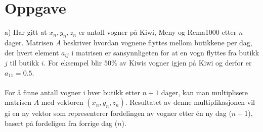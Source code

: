 

\usepackage{graphicx}
\graphicspath{ {./fig/} }


\newcommand{\tuple}[1]{\ensuremath{\langle #1\rangle}}
\newcommand{\set}[1]{\ensuremath{\{#1\}}}
\newcommand{\imp}{\ensuremath{\rightarrow}}
\newcommand{\M}{\ensuremath{\mathcal{M}}}
\newcommand{\AF}{edge from parent[draw=none]}
\newcommand{\NODE}[1]{\{node \{\ensuremath{#1}\}\}}
\usepackage{matlab-prettifier}

\usepackage[explicit]{titlesec}





\maketitle

\renewcommand{\thesubsection}{(\alph{subsection})}


\section{Oppgave} %
a) Har gitt at $x_n, y_n,z_n$ er antall vogner på Kiwi, Meny og Rema1000 etter $n$ dager. Matrisen $A$ beskriver hvordan vognene flyttes mellom butikkene per dag, der hvert element $a_{ij}$ i matrisen er sansynnligeten for at en vogn flyttes fra butikk $j$ til butikk $i$. For eksempel blir $50\%$ av Kiwis vogner igjen på Kiwi og derfor er $a_{11} = 0.5$. \\\\
For å finne antall vogner i hver butikk etter $n+1$ dager, kan man multiplisere matrisen $A$ med vektoren $(x_n,y_n, z_n)$. Resultatet av denne multiplikasjonen vil gi en ny vektor som representerer fordelingen av vogner etter én ny dag ($n+1$), basert på fordeligen fra forrige dag ($n$). 

